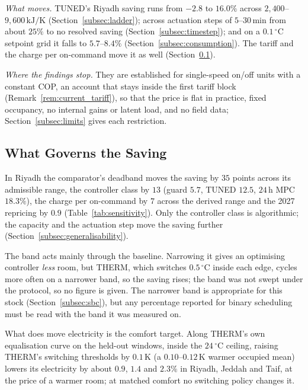 \documentclass[3p,twocolumn,number]{elsarticle}
\begin{document}
\emph{What moves.} TUNED's Riyadh saving runs from $-2.8$ to $16.0\%$ across $2{,}400$--$9{,}600\,\text{kJ/K}$ (Section~\ref{subsec:ladder}); across actuation steps of $5$--$30\,$min from about $25\%$ to no resolved saving (Section~\ref{subsec:timestep}); and on a $0.1\,^\circ$C setpoint grid it falls to $5.7$--$8.4\%$ (Section~\ref{subsec:consumption}). The tariff and the charge per on-command move it as well (Section~\ref{subsec:disc_band}).

\emph{Where the findings stop.} They are established for single-speed on/off units with a constant COP, an account that stays inside the first tariff block (Remark~\ref{rem:current_tariff}), so that the price is flat in practice, fixed occupancy, no internal gains or latent load, and no field data; Section~\ref{subsec:limits} gives each restriction.

\subsection{What Governs the Saving}
\label{subsec:disc_band}
\label{subsec:disc_tariff}
\label{subsec:disc_modele}

In Riyadh the comparator's deadband moves the saving by $35$ points across its admissible range, the controller class by $13$ (guard $5.7$, TUNED $12.5$, $24\,$h MPC $18.3\%$), the charge per on-command by $7$ across the derived range and the 2027 repricing by $0.9$ (Table~\ref{tab:sensitivity}). Only the controller class is algorithmic; the capacity and the actuation step move the saving further (Section~\ref{subsec:generalisability}).

The band acts mainly through the baseline. Narrowing it gives an optimising controller \emph{less} room, but THERM, which switches $0.5\,^\circ$C inside each edge, cycles more often on a narrower band, so the saving rises; the band was not swept under the protocol, so no figure is given. The narrower band is appropriate for this stock (Section~\ref{subsec:sbc}), but any percentage reported for binary scheduling must be read with the band it was measured on.

What does move electricity is the comfort target. Along THERM's own equalisation curve on the held-out windows, inside the $24\,^\circ$C ceiling, raising THERM's switching thresholds by $0.1\,$K (a $0.10$--$0.12\,$K warmer occupied mean) lowers its electricity by about $0.9$, $1.4$ and $2.3\%$ in Riyadh, Jeddah and Taif, at the price of a warmer room; at matched comfort no switching policy changes it.
\end{document}
